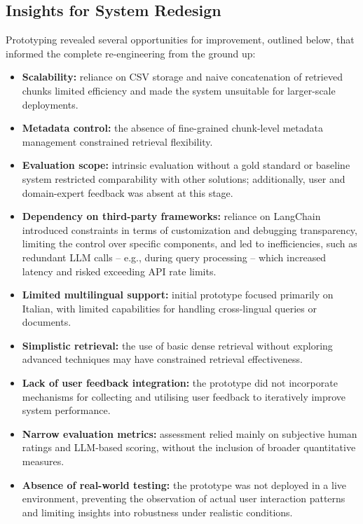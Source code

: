 \begin{spacing}{1.5}
\subsection{Insights for System Redesign}
Prototyping revealed several opportunities for improvement, outlined below, that informed the complete re-engineering from the ground up:
\begin{itemize}
      \item \textbf{Scalability:} reliance on CSV storage and naive concatenation of retrieved chunks limited efficiency and made the system unsuitable for larger-scale deployments.
      \item \textbf{Metadata control:} the absence of fine-grained chunk-level metadata management constrained retrieval flexibility.
      \item \textbf{Evaluation scope:} intrinsic evaluation without a gold standard or baseline system restricted comparability with other solutions; additionally, user and domain-expert feedback was absent at this stage.
      \item \textbf{Dependency on third-party frameworks:} reliance on LangChain introduced constraints in terms of customization and debugging transparency, limiting the control over specific components, and led to inefficiencies, such as redundant LLM calls -- e.g., during query processing -- which increased latency and risked exceeding API rate limits.
      \item \textbf{Limited multilingual support:} initial prototype focused primarily on Italian, with limited capabilities for handling cross-lingual queries or documents.
      \item \textbf{Simplistic retrieval:} the use of basic dense retrieval without exploring advanced techniques may have constrained retrieval effectiveness.
      \item \textbf{Lack of user feedback integration:} the prototype did not incorporate mechanisms for collecting and utilising user feedback to iteratively improve system performance.
      \item \textbf{Narrow evaluation metrics:} assessment relied mainly on subjective human ratings and LLM-based scoring, without the inclusion of broader quantitative measures.
      \item \textbf{Absence of real-world testing:} the prototype was not deployed in a live environment, preventing the observation of actual user interaction patterns and limiting insights into robustness under realistic conditions.
\end{itemize}


\end{spacing}
